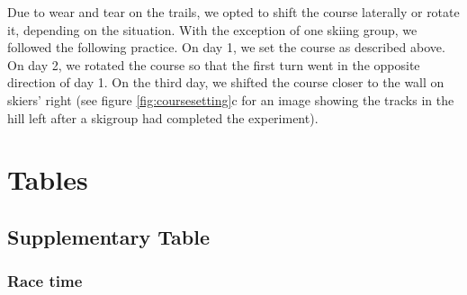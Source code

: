 \documentclass[pdflatex,sn-mathphys-num]{sn-jnl}%
\theoremstyle{thmstyleone}%
\theoremstyle{thmstyletwo}%
\theoremstyle{thmstylethree}%
\begin{document}
\begin{appendices}
Due to wear and tear on the trails, we opted to shift the course laterally or rotate it, depending on the situation. With the exception of one skiing group, we followed the following practice. On day 1, we set the course as described above. On day 2, we rotated the course so that the first turn went in the opposite direction of day 1. On the third day, we shifted the course closer to the wall on skiers' right (see figure \ref{fig:coursesetting}c for an image showing the tracks in the hill left after a skigroup had completed the experiment). 


\section{Tables}


\subsection{Supplementary Table}

\subsubsection{Race time}


\end{appendices}
\end{document}
